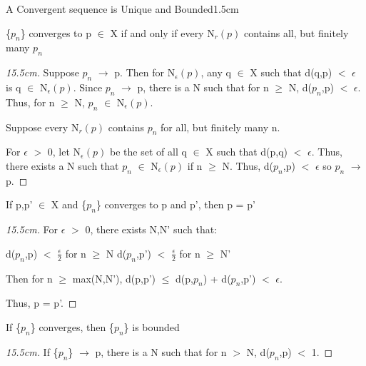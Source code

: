     \begin{ltheorem}{A Convergent sequence is Unique and Bounded}{1.5cm}
        \item \{$p_n$\} converges to p $\in$ X if and only if
            every N$_r(p)$ contains all, but finitely many $p_n$

            \begin{proof}[15.5cm]
                Suppose $p_n$ $\rightarrow$ p.
                Then for N$_{\epsilon}(p)$, any q $\in$ X such that
                d(q,p) $<$ $\epsilon$ is q $\in$ N$_{\epsilon}(p)$.
                Since $p_n$ $\rightarrow$ p, there is a N such that for
                n $\geq$ N, d($p_n$,p) $<$ $\epsilon$.
                Thus, for n $\geq$ N, $p_n$ $\in$ N$_{\epsilon}(p)$.

                Suppose every N$_r(p)$ contains $p_n$ for all, but finitely
                many n.

                For $\epsilon$ $>$ 0, let N$_{\epsilon}(p)$ be the set of
                all q $\in$ X such that d(p,q) $<$ $\epsilon$.
                Thus, there exists a N such that $p_n$ $\in$ N$_{\epsilon}(p)$
                if n $\geq$ N.
                Thus, d($p_n$,p) $<$ $\epsilon$ so $p_n$ $\rightarrow$ p.
            \end{proof}

        \item If p,p' $\in$ X and \{$p_n$\} converges to p and p', then p = p'

            \begin{proof}[15.5cm]
                For $\epsilon$ $>$ 0, there exists N,N' such that:

                \hspace{1cm}
                d($p_n$,p) $<$ $\frac{\epsilon}{2}$ for n $\geq$ N
                \hspace{1cm}
                d($p_n$,p') $<$ $\frac{\epsilon}{2}$ for n $\geq$ N'

                Then for n $\geq$ max(N,N'),
                d(p,p') $\leq$ d(p,$p_n$) + d($p_n$,p') $<$ $\epsilon$.

                Thus, p = p'.
            \end{proof}

            \newpage

        \item If \{$p_n$\} converges, then \{$p_n$\} is bounded

            \begin{proof}[15.5cm]
                If \{$p_n$\} $\rightarrow$ p,
                there is a N such that for n $>$ N, d($p_n$,p) $<$ 1.


\end{proof}
\end{ltheorem}
